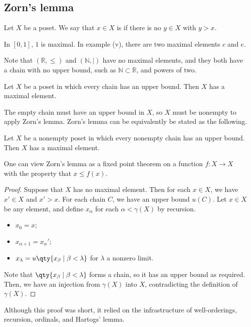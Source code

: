 \subsection{Zorn's lemma}
\begin{definition}
    Let $X$ be a poset.
    We say that $x \in X$ is  if there is no $y \in X$ with $y > x$.
\end{definition}
\begin{example}
    In $[0,1]$, $1$ is maximal.
    In example (v), there are two maximal elements $c$ and $e$.
\end{example}
Note that $(\mathbb R, \leq)$ and $(\mathbb N, \mid)$ have no maximal elements, and they both have a chain with no upper bound, such as $\mathbb N \subset \mathbb R$, and powers of two.
\begin{theorem}
    Let $X$ be a poset in which every chain has an upper bound.
    Then $X$ has a maximal element.
\end{theorem}
The empty chain must have an upper bound in $X$, so $X$ must be nonempty to apply Zorn's lemma.
Zorn's lemma can be equivalently be stated as the following.
\begin{theorem}
    Let $X$ be a nonempty poset in which every nonempty chain has an upper bound.
    Then $X$ has a maximal element.
\end{theorem}
One can view Zorn's lemma as a fixed point theorem on a function $f \colon X \to X$ with the property that $x \leq f(x)$.
\begin{proof}
    Suppose that $X$ has no maximal element.
    Then for each $x \in X$, we have $x' \in X$ and $x' > x$.
    For each chain $C$, we have an upper bound $u(C)$.
    Let $x \in X$ be any element, and define $x_\alpha$ for each $\alpha < \gamma(X)$ by recursion.
    \begin{itemize}
        \item $x_0 = x$;
        \item $x_{\alpha + 1} = x_\alpha'$;
        \item $x_\lambda = u\qty{x_\beta \mid \beta < \lambda}$ for $\lambda$ a nonzero limit.
    \end{itemize}
    Note that $\qty{x_\beta \mid \beta < \lambda}$ forms a chain, so it has an upper bound as required.
    Then, we have an injection from $\gamma(X)$ into $X$, contradicting the definition of $\gamma(X)$.
\end{proof}
\begin{remark}
    Although this proof was short, it relied on the infrastructure of well-orderings, recursion, ordinals, and Hartogs' lemma.
\end{remark}
